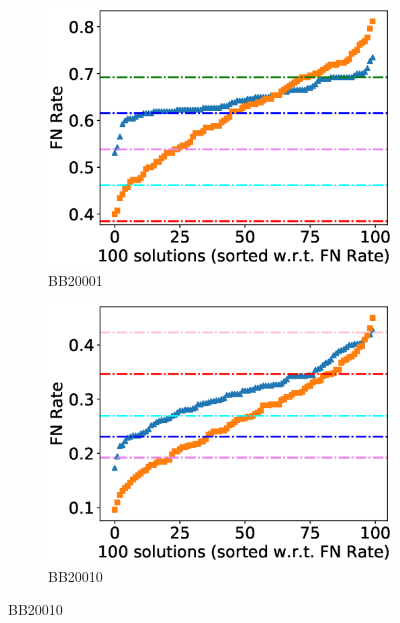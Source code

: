 \begin{figure}[!htbp]
	\centering
	\begin{adjustwidth}{-1cm}{-1cm}
		\begin{subfigure}{0.22\textwidth}
			\includegraphics[width=\columnwidth]{Figure/summary/precomputedInit/Balibase/BB20001_fnrate_density_single_run}
			\caption{BB20001}
		\end{subfigure}	
		\begin{subfigure}{0.22\textwidth}
			\includegraphics[width=\columnwidth]{Figure/summary/precomputedInit/Balibase/BB20010_fnrate_density_single_run}
			\caption{BB20010}
		\end{subfigure}

\end{adjustwidth}
\end{figure}
